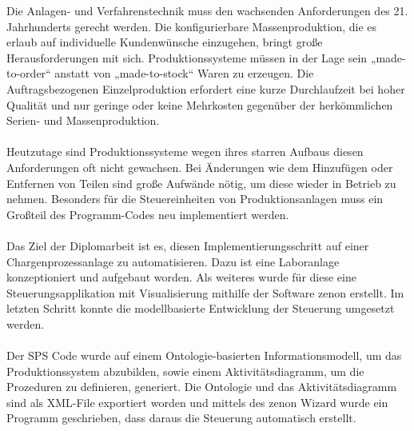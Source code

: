 Die Anlagen- und Verfahrenstechnik muss den wachsenden Anforderungen des 21. Jahrhunderts gerecht werden. Die konfigurierbare Massenproduktion, die es erlaub auf individuelle Kundenwünsche einzugehen, bringt große Herausforderungen mit sich. Produktionssysteme müssen in der Lage sein „made-to-order“ anstatt von „made-to-stock“ Waren zu erzeugen. Die Auftragsbezogenen Einzelproduktion erfordert eine kurze Durchlaufzeit bei hoher Qualität und nur geringe oder keine Mehrkosten gegenüber der herkömmlichen Serien- und Massenproduktion. \\\\
Heutzutage sind Produktionssysteme wegen ihres starren Aufbaus diesen Anforderungen oft nicht gewachsen. Bei Änderungen wie dem Hinzufügen oder Entfernen von Teilen sind große Aufwände nötig, um diese wieder in Betrieb zu nehmen. Besonders für die Steuereinheiten von Produktionsanlagen muss ein Großteil des Programm-Codes neu implementiert werden.\\\\
Das Ziel der Diplomarbeit ist es, diesen Implementierungsschritt auf einer Chargenprozessanlage zu automatisieren. Dazu ist eine Laboranlage konzeptioniert und aufgebaut worden. Als weiteres wurde für diese eine Steuerungsapplikation mit Visualisierung mithilfe der Software zenon erstellt. Im letzten Schritt konnte die modellbasierte Entwicklung der Steuerung umgesetzt werden. 
\\\\
Der SPS Code wurde auf einem Ontologie-basierten Informationsmodell, um das Produktionssystem abzubilden, sowie einem Aktivitätsdiagramm, um die Prozeduren zu definieren, generiert. Die Ontologie und das Aktivitätsdiagramm sind als XML-File exportiert worden und mittels des zenon Wizard wurde ein Programm geschrieben, dass daraus die Steuerung automatisch erstellt.\\\\

